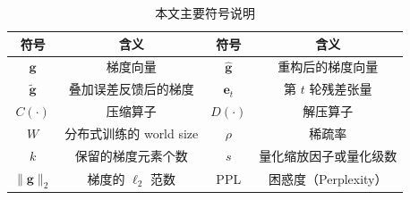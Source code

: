 \begin{denotation}
\begin{table}[h]
\caption{本文主要符号说明}
\vspace{0.5em}\centering\wuhao
\renewcommand{\arraystretch}{1.3}
\begin{tabular}{cccc}
\toprule
符号 & 含义 & 符号 & 含义 \\
\midrule
$\mathbf{g}$ & 梯度向量 & $\hat{\mathbf{g}}$ & 重构后的梯度向量 \\
$\tilde{\mathbf{g}}$ & 叠加误差反馈后的梯度 & $\mathbf{e}_t$ & 第 $t$ 轮残差张量 \\
$C(\cdot)$ & 压缩算子 & $D(\cdot)$ & 解压算子 \\
$W$ & 分布式训练的 world size & $\rho$ & 稀疏率 \\
$k$ & 保留的梯度元素个数 & $s$ & 量化缩放因子或量化级数 \\
$\|\mathbf{g}\|_2$ & 梯度的 $\ell_2$ 范数 & PPL & 困惑度（Perplexity） \\
\bottomrule
\end{tabular}
\renewcommand{\arraystretch}{1.0}
\end{table}
\end{denotation}
